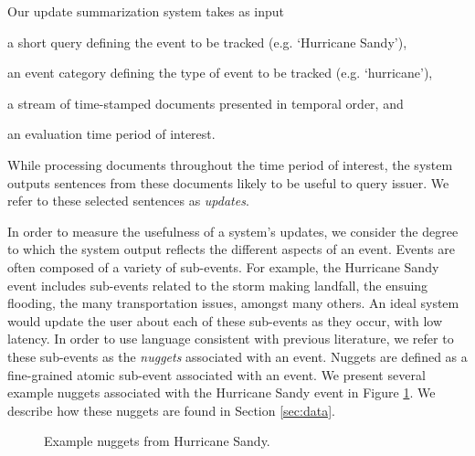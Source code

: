 
Our update summarization system takes as input 
\begin{enumerate*}[label=\itshape\alph*\upshape)]
  \item a short query defining the event to be tracked (e.g. `Hurricane Sandy'), 
  \item an event category defining the type of event to be tracked (e.g. `hurricane'), 
  \item a stream of time-stamped documents %
  presented in temporal order, and \item an evaluation time period of interest.
\end{enumerate*} 
While processing documents
throughout the time period of interest, the system outputs sentences
from these documents likely to be useful to query issuer.  We refer
to these selected sentences as \emph{updates}.

In order to measure the usefulness of a system's updates, we consider
the degree to which the system output reflects the different
aspects of an event.  Events are often composed of a variety of sub-events.  
For example, the Hurricane Sandy
event includes sub-events related to the storm making landfall,
the ensuing flooding, the many transportation issues, amongst many
others.  An ideal system would update the user about each of these
sub-events as they occur, with low latency.  In order to use
language consistent with previous literature, we refer to these
sub-events as the \emph{nuggets} associated with an event.  Nuggets are
defined as a fine-grained atomic sub-event associated with an event.  
We present several example nuggets associated with the Hurricane
Sandy event in Figure \ref{fig:nuggets}.  We describe how these 
nuggets are found in Section \ref{sec:data}.


\begin{figure}
\setlength{\fboxsep}{10pt}
 \caption{Example nuggets from Hurricane Sandy.\label{fig:nuggets}}
\end{figure}


